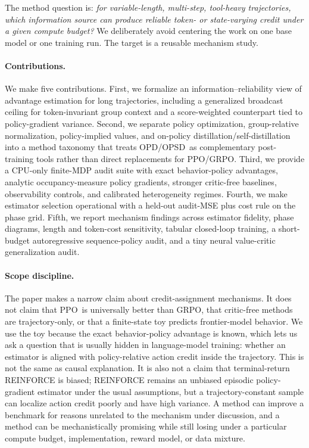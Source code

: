 \documentclass[11pt]{article}
\newcommand{\grpo}{\textsc{GRPO}}
\newcommand{\opd}{\textsc{OPD}}
\newcommand{\opsd}{\textsc{OPSD}}
\newcommand{\ppo}{\textsc{PPO}}
\begin{document}
The method question is:
\emph{for variable-length, multi-step, tool-heavy trajectories, which
information source can produce reliable token- or state-varying credit under a
given compute budget?} We deliberately avoid centering the work on one base
model or one training run. The target is a reusable mechanism study.

\paragraph{Contributions.}
We make five contributions. First, we formalize an information--reliability
view of advantage estimation for long trajectories, including a generalized
broadcast ceiling for token-invariant group context and a score-weighted
counterpart tied to policy-gradient variance. Second, we separate policy
optimization, group-relative normalization, policy-implied values, and
on-policy distillation/self-distillation into a method taxonomy that treats
\opd/\opsd\ as complementary post-training tools rather than direct
replacements for \ppo/\grpo. Third, we provide a CPU-only finite-MDP audit
suite with exact behavior-policy advantages, analytic occupancy-measure policy
gradients, stronger critic-free baselines, observability controls, and
calibrated heterogeneity regimes. Fourth, we make estimator selection
operational with a held-out audit-MSE plus cost rule on the phase grid. Fifth,
we report mechanism findings across estimator fidelity, phase diagrams, length
and token-cost sensitivity, tabular closed-loop training, a short-budget
autoregressive sequence-policy audit, and a tiny neural value-critic
generalization audit.

\paragraph{Scope discipline.}
The paper makes a narrow claim about credit-assignment mechanisms. It does not
claim that \ppo\ is universally better than \grpo, that critic-free methods are
trajectory-only, or that a finite-state toy predicts frontier-model behavior. We use the toy
because the exact behavior-policy advantage is known, which lets us ask a
question that is usually hidden in language-model training: whether an
estimator is aligned with policy-relative action credit inside the trajectory.
This is not the same as causal explanation. It is also not a claim that
terminal-return REINFORCE is biased; REINFORCE remains an unbiased episodic
policy-gradient estimator under the usual assumptions, but a
trajectory-constant sample can localize action credit poorly and have high
variance. A method can improve a benchmark for reasons unrelated to the
mechanism under discussion, and a method can be mechanistically promising while
still losing under a particular compute budget, implementation, reward model,
or data mixture.
\end{document}

